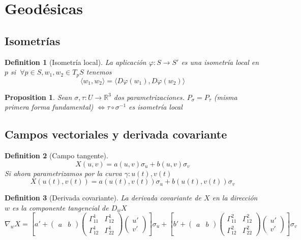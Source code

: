 \documentclass[leqno]{article}
\newtheorem*{definition}{Definition}
\newtheorem*{proposition}{Proposition}
\begin{document}
\section{Geodésicas}
\subsection{Isometrías}
\begin{definition}[Isometría local]
La aplicación $\varphi :S \to  S'$ es una isometría local en $p$ si $\ \forall p\in S, w_1, w_2\in T_pS$ tenemos 
\[
\langle w_1, w_2 \rangle = \langle D\varphi (w_1), D\varphi (w_2) \rangle 
\] 
\end{definition}

\begin{proposition}
Sean $\sigma , \tau :U\to \mathbb{R}^3$ dos parametrizaciones. $P_\sigma  = P_\tau$ (misma primera forma fundamental) $\iff \tau \circ \sigma ^{-1}$ es isometría local
\end{proposition}

\subsection{Campos vectoriales y derivada covariante}
\begin{definition}[Campo tangente]
 \[
X(u, v)= a(u, v)\sigma _u + b (u, v)\sigma_v
\] 
Si ahora parametrizamos por la curva  $\gamma: u(t), v(t)$ 
\[
X(u(t), v(t)) = a(u(t), v(t))\sigma _u + b(u(t), v(t))\sigma _v
\] 
\end{definition}

\begin{definition}[Derivada covariante]
La derivada covariante de $X$ en la dirección $w$ es la componente tangencial de $D_w X$ 
\[
  \nabla _wX = \left[ a' + \begin{pmatrix} a & b \end{pmatrix} \begin{pmatrix} \Gamma_{11}^1 & \Gamma _{12}^1 \\ \Gamma _{12}^1 & \Gamma_{22}^1 \end{pmatrix} \begin{pmatrix} u' \\ v' \end{pmatrix}   \right] \sigma _u + \left[ b' + \begin{pmatrix} a & b \end{pmatrix} \begin{pmatrix} \Gamma _{11}^2 & \Gamma _{12}^2 \\ \Gamma _{12}^2 & \Gamma _{22}^2 \end{pmatrix} \begin{pmatrix} u' \\ v' \end{pmatrix}   \right] \sigma _v
\] 
\end{definition}
\end{document}

